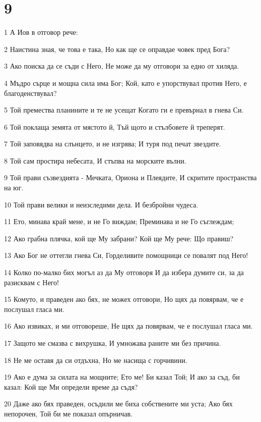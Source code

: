 \chapter{9}

\par 1 А Иов в отговор рече:
\par 2 Наистина зная, че това е така, Но как ще се оправдае човек пред Бога?
\par 3 Ако поиска да се съди с Него, Не може да му отговори за едно от хиляда.
\par 4 Мъдро сърце и мощна сила има Бог; Кой, като е упорствувал против Него, е благоденствувал?
\par 5 Той премества планините и те не усещат Когато ги е превърнал в гнева Си.
\par 6 Той поклаща земята от мястото й, Тъй щото и стълбовете й треперят.
\par 7 Той заповядва на слънцето, и не изгрява; И туря под печат звездите.
\par 8 Той сам простира небесата, И стъпва на морските вълни.
\par 9 Той прави съзвездията - Мечката, Ориона и Плеядите, И скритите пространства на юг.
\par 10 Той прави велики и неизследими дела. И безбройни чудеса.
\par 11 Ето, минава край мене, и не Го виждам; Преминава и не Го съглеждам;
\par 12 Ако грабна плячка, кой ще Му забрани? Кой ще Му рече: Що правиш?
\par 13 Ако Бог не оттегли гнева Си, Горделивите помощници се повалят под Него!
\par 14 Колко по-малко бих могъл аз да Му отговоря И да избера думите си, за да разисквам с Него!
\par 15 Комуто, и праведен ако бях, не можех отговори, Но щях да повярвам, че е послушал гласа ми.
\par 16 Ако извиках, и ми отговореше, Не щях да повярвам, че е послушал гласа ми.
\par 17 Защото ме смазва с вихрушка, И умножава раните ми без причина.
\par 18 Не ме оставя да си отдъхна, Но ме насища с горчивини.
\par 19 Ако е дума за силата на мощните; Ето ме! Би казал Той; И ако за съд, би казал: Кой ще Ми определи време да съдя?
\par 20 Даже ако бях праведен, осъдили ме биха собствените ми уста; Ако бях непорочен, Той би ме показал опърничав.
